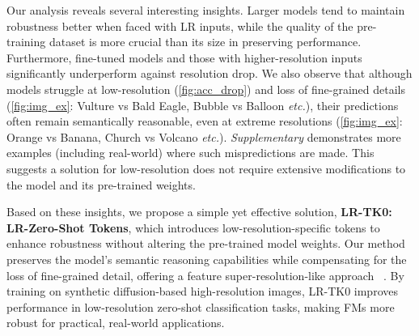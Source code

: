 Our analysis reveals several interesting insights. Larger models tend to maintain robustness better when faced with LR inputs, while the quality of the pre-training dataset is more crucial than its size in preserving performance. 
Furthermore, fine-tuned models and those with higher-resolution inputs significantly underperform against resolution drop. 
We also observe that although models struggle at low-resolution 
(\cref{fig:acc_drop}) and loss of fine-grained details (\cref{fig:img_ex}: \eg Vulture vs Bald Eagle, Bubble vs Balloon \textit{etc.}), their predictions often remain semantically reasonable, even at extreme resolutions (\cref{fig:img_ex}: \eg Orange vs Banana, Church vs Volcano \textit{etc.}). 
\textit{Supplementary} demonstrates more examples (including real-world) where such mispredictions are made.    
This suggests a solution for low-resolution does not require extensive modifications to the model and its pre-trained weights. 






\iffalse

\fi

Based on these insights, we propose a simple yet effective solution, \textbf{LR-TK0: LR-Zero-Shot Tokens}, which introduces low-resolution-specific tokens to enhance robustness without altering the pre-trained model weights. Our method preserves the model's semantic reasoning capabilities while compensating for the loss of fine-grained detail, offering a feature super-resolution-like approach ~\citep{chen2024robustsam}. By training on synthetic diffusion-based high-resolution images, LR-TK0 improves performance in low-resolution zero-shot classification tasks, making FMs more robust for practical, real-world applications.



